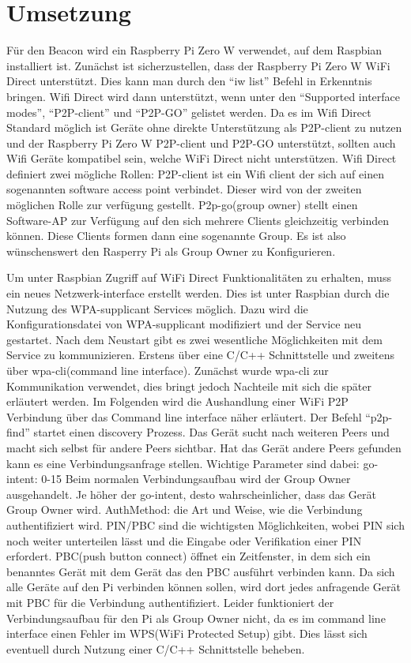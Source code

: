 \section{Umsetzung}
Für den Beacon wird ein Raspberry Pi Zero W verwendet, auf dem Raspbian installiert ist.
Zunächst ist sicherzustellen, dass der Raspberry Pi Zero W WiFi Direct unterstützt. Dies kann man durch den \enquote{iw list} Befehl in Erkenntnis bringen. Wifi Direct wird dann unterstützt, wenn unter den \enquote{Supported interface modes}, \enquote{P2P-client} und \enquote{P2P-GO} gelistet werden. Da es im Wifi Direct Standard möglich ist Geräte ohne direkte Unterstützung als P2P-client zu nutzen und der Raspberry Pi Zero W P2P-client und P2P-GO unterstützt, sollten auch Wifi Geräte kompatibel sein, welche WiFi Direct nicht unterstützen.
Wifi Direct definiert zwei mögliche Rollen: P2P-client ist ein Wifi client der sich auf einen sogenannten software access point verbindet. Dieser wird von der zweiten möglichen Rolle zur verfügung gestellt. P2p-go(group owner) stellt einen Software-AP zur Verfügung auf den sich mehrere Clients gleichzeitig verbinden können. Diese Clients formen dann eine sogenannte Group. Es ist also wünschenswert den Rasperry Pi als Group Owner zu Konfigurieren.

Um unter Raspbian Zugriff auf WiFi Direct Funktionalitäten zu erhalten, muss ein neues Netzwerk-interface erstellt werden. Dies ist unter Raspbian durch die Nutzung des WPA-supplicant Services möglich. Dazu wird die Konfigurationsdatei von WPA-supplicant modifiziert und der Service neu gestartet. Nach dem Neustart gibt es zwei wesentliche Möglichkeiten mit dem Service zu kommunizieren. Erstens über eine C/C++ Schnittstelle und zweitens über wpa-cli(command line interface). Zunächst wurde wpa-cli zur Kommunikation verwendet, dies bringt jedoch Nachteile mit sich die später erläutert werden. Im Folgenden wird die Aushandlung einer WiFi P2P Verbindung über das Command line interface näher erläutert. Der Befehl \enquote{p2p-find} startet einen discovery Prozess. Das Gerät sucht nach weiteren Peers und macht sich selbst für andere Peers sichtbar. Hat das Gerät andere Peers gefunden kann es eine Verbindungsanfrage stellen. Wichtige Parameter sind dabei: go-intent: 0-15 Beim normalen Verbindungsaufbau wird der Group Owner ausgehandelt. Je höher der go-intent, desto wahrscheinlicher, dass das Gerät Group Owner wird. AuthMethod: die Art und Weise, wie die Verbindung authentifiziert wird. PIN/PBC sind die wichtigsten Möglichkeiten, wobei PIN sich noch weiter unterteilen lässt und die Eingabe oder Verifikation einer PIN erfordert. PBC(push button connect) öffnet ein Zeitfenster, in dem sich ein benanntes Gerät mit dem Gerät das den PBC ausführt verbinden kann. Da sich alle Geräte auf den Pi verbinden können sollen, wird dort jedes anfragende Gerät mit PBC für die Verbindung authentifiziert. Leider funktioniert der Verbindungsaufbau für den Pi als Group Owner nicht, da es im command line interface einen Fehler im WPS(WiFi Protected Setup) gibt. Dies lässt sich eventuell durch Nutzung einer C/C++ Schnittstelle beheben.

